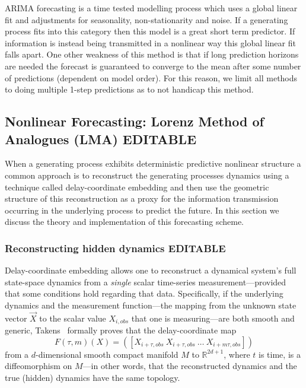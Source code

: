 ARIMA forecasting is a time tested modelling process which uses a global linear fit and adjustments for seasonality, non-stationarity and noise. If a generating process fits into this category then this model is a great short term predictor. If information is instead being transmitted in a nonlinear way this global linear fit falls apart. One other weakness of this method is that if long prediction horizons are needed the forecast is guaranteed to converge to the mean after some number of predictions (dependent on model order). For this reason, we limit all methods to doing multiple 1-step predictions as to not handicap this method. 

\subsection{Nonlinear Forecasting: Lorenz Method of Analogues (LMA){\color{blue} EDITABLE}}\label{sec:lma}

When a generating process exhibits deterministic predictive nonlinear structure a common approach is to reconstruct the generating processes dynamics using a technique called delay-coordinate embedding and then use the geometric structure of this reconstruction as a proxy for the information transmission occurring in the underlying process to predict the future. In this section we discuss the theory and implementation of this forecasting scheme. 


 \subsubsection{Reconstructing hidden dynamics {\color{blue} EDITABLE}}



Delay-coordinate embedding allows one to reconstruct a dynamical system's full
state-space dynamics from a \emph{single} scalar time-series
measurement---provided that some conditions hold regarding that data.
Specifically, if the underlying dynamics and the measurement
function---the mapping from the unknown state vector $\vec{X}$ to the
scalar value $X_{i,obs}$ that one is measuring---are both smooth and generic,
Takens~\cite{takens} formally proves that the delay-coordinate map
\[
F(\tau,m)(X) = ([X_{i+\tau,obs} ~ X_{i+\tau,obs} ~ \dots ~X_{i+m\tau,obs}])
\]
from a $d$-dimensional smooth compact manifold $M$ to $\mathbb{R}^{2d+1}$,
where $t$ is time, is a diffeomorphism on $M$---in other words, that
the reconstructed dynamics and the true (hidden) dynamics have the
same topology.


